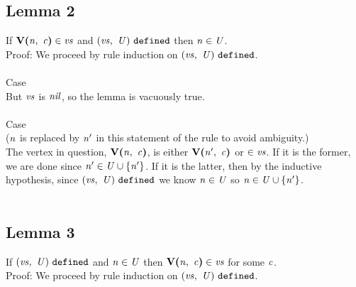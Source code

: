 \documentclass[12pt]{article}
\begin{document}
\subsection{Lemma 2}

If $\textbf{V(}\mathit{n},\ \mathit{c}\textbf{)} \in \mathit{vs}$ and
$(\mathit{vs},\ \mathit{U})\ \mathtt{defined}$ then $\mathit{n} \in \mathit{U}$.\\

Proof: We proceed by rule induction on $(\mathit{vs},\ \mathit{U})\ \mathtt{defined}$.\\
\\

Case
\\

But $\mathit{vs}$ is $\mathit{nil}$, so the lemma is vacuously true.\\
\\

Case
\\
($\mathit{n}$ is replaced by $\mathit{n'}$ in this statement of the rule to avoid
ambiguity.)
\\

The vertex in question, $\textbf{V(}\mathit{n},\ \mathit{c}\textbf{)}$, is either
$\textbf{V(}\mathit{n'},\ \mathit{c}\textbf{)}$ or $\in \mathit{vs}$. If it is the former, we are
done since $\mathit{n'} \in \mathit{U} \cup \{\mathit{n'}\}$. If it is
the latter, then by the inductive hypothesis, since
$(\mathit{vs},\ \mathit{U})\ \mathtt{defined}$ we know $\mathit{n} \in \mathit{U}$ so
$\mathit{n} \in \mathit{U} \cup \{\mathit{n'}\}$.\\
\\

\subsection{Lemma 3}

If $(\mathit{vs},\ \mathit{U})\ \mathtt{defined}$ and $\mathit{n} \in \mathit{U}$ then
$\textbf{V(}\mathit{n},\ \mathit{c}\textbf{)} \in \mathit{vs}$ for some $\mathit{c}$.\\

Proof: We proceed by rule induction on $(\mathit{vs},\ \mathit{U})\ \mathtt{defined}$.\\
\\
\end{document}
